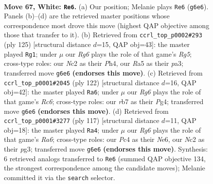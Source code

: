 \documentclass[11pt]{article}
\begin{document}
\clearpage

\begin{figure}[p]\centering
\begin{subfigure}{0.46\textwidth}\centering
\resizebox{\linewidth}{!}{%
\newchessgame
\chessboard[
  setfen={6k1/1r4b1/6R1/R7/2P5/7K/2N5/8 w - - 54 67},
  showmover=false,
  pgfstyle=straightmove, color=movearrow, markmove={g6-e6}
]}
\caption{}
\end{subfigure}\hfill
\begin{subfigure}{0.46\textwidth}\centering
\resizebox{\linewidth}{!}{%
\newchessgame
\chessboard[
  setfen={8/3k4/R7/1p6/4KBrp/P7/8/8 b - - 1 63},
  showmover=false,
  pgfstyle=straightmove, color=movearrow, markmove={g4-g1}
]}
\caption{}
\end{subfigure}
\\[4pt]
\begin{subfigure}{0.46\textwidth}\centering
\resizebox{\linewidth}{!}{%
\newchessgame
\chessboard[
  setfen={8/8/2R5/2b3p1/2k1K1P1/8/6n1/8 w - - 12 62},
  showmover=false,
  pgfstyle=straightmove, color=movearrow, markmove={c6-a6}
]}
\caption{}
\end{subfigure}\hfill
\begin{subfigure}{0.46\textwidth}\centering
\resizebox{\linewidth}{!}{%
\newchessgame
\chessboard[
  setfen={8/8/4nk2/3R4/8/r2BK1P1/8/8 b - - 16 59},
  showmover=false,
  pgfstyle=straightmove, color=movearrow, markmove={a3-a4}
]}
\caption{}
\end{subfigure}
\caption{\textbf{Move 67, White: \texttt{Re6}.} (a) Our position; Melanie plays \texttt{Re6} (\texttt{g6e6}). Panels (b)--(d) are the retrieved master positions whose correspondence most drove this move (highest QAP objective among those that transfer to it). (b) Retrieved from \texttt{ccrl\_top\_p0002\#293} (ply 125) [structural distance $d$=15, QAP obj=43]: the master played \texttt{Rg1}; under $\mu$ our \emph{Rg6} plays the role of that game's \emph{Rg5}; cross-type roles: our \emph{N}c2 as their \emph{P}h4, our \emph{R}a5 as their \emph{p}a3; transferred move \texttt{g6e6} \textbf{(endorses this move)}. (c) Retrieved from \texttt{ccrl\_top\_p0001\#2045} (ply 122) [structural distance $d$=16, QAP obj=42]: the master played \texttt{Ra6}; under $\mu$ our \emph{Rg6} plays the role of that game's \emph{Rc6}; cross-type roles: our \emph{r}b7 as their \emph{P}g4; transferred move \texttt{g6e6} \textbf{(endorses this move)}. (d) Retrieved from \texttt{ccrl\_top\_p0001\#3277} (ply 117) [structural distance $d$=11, QAP obj=18]: the master played \texttt{Ra4}; under $\mu$ our \emph{Rg6} plays the role of that game's \emph{Ra6}; cross-type roles: our \emph{P}c4 as their \emph{N}e6, our \emph{N}c2 as their \emph{p}g3; transferred move \texttt{g6e6} \textbf{(endorses this move)}. Synthesis: 6 retrieved analogs transferred to \texttt{Re6} (summed QAP objective 134, the strongest correspondence among the candidate moves); Melanie committed it via the \texttt{search} selector.}
\label{fig:thought-m132}
\end{figure}
\end{document}
